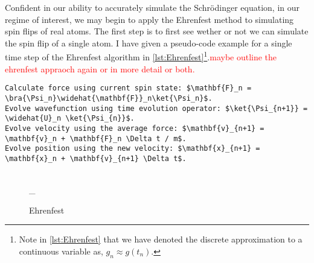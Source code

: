Confident in our ability to accurately simulate the Schr\"odinger equation, in our regime of interest, we may begin to apply the Ehrenfest method to simulating spin flips of real atoms.
The first step is to first see wether or not we can simulate the spin flip of a single atom.
I have given a pseudo-code example for a single time step of the Ehrenfest algorithm in \autoref{lst:Ehrenfest}\footnote{Note in \autoref{lst:Ehrenfest} that we have denoted the discrete approximation to a continuous variable as, $g_n \approx g(t_n)$.}.\textcolor{red}{maybe outline the ehrenfest appraoch again or in more detail or both.}
\begin{lstlisting}[float,caption=Psuedo-code algorithm for a single Ehrenfest method time step, mathescape,label= lst:Ehrenfest,stepnumber=1]
Calculate force using current spin state: $\mathbf{F}_n = \bra{\Psi_n}\widehat{\mathbf{F}}_n\ket{\Psi_n}$.
Evolve wavefunction using time evolution operator: $\ket{\Psi_{n+1}} = \widehat{U}_n \ket{\Psi_{n}}$.
Evolve velocity using the average force: $\mathbf{v}_{n+1} = \mathbf{v}_n + \mathbf{F}_n \Delta t / m$.
Evolve position using the new velocity: $\mathbf{x}_{n+1} = \mathbf{x}_n + \mathbf{v}_{n+1} \Delta t$.
\end{lstlisting}

\begin{figure}
\hspace{-12em}
\\\_
\hspace{-12em}
\caption{Ehrenfest}\label{fig:ehrenfestFlip}
\end{figure}


